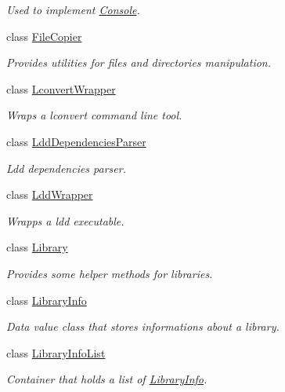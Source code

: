 \begin{DoxyCompactItemize}
\begin{DoxyCompactList}\small\item\em Used to implement \hyperlink{class_mdt_1_1_deploy_utils_1_1_console}{Console}. \end{DoxyCompactList}\item 
class \hyperlink{class_mdt_1_1_deploy_utils_1_1_file_copier}{File\+Copier}
\begin{DoxyCompactList}\small\item\em Provides utilities for files and directories manipulation. \end{DoxyCompactList}\item 
class \hyperlink{class_mdt_1_1_deploy_utils_1_1_lconvert_wrapper}{Lconvert\+Wrapper}
\begin{DoxyCompactList}\small\item\em Wraps a lconvert command line tool. \end{DoxyCompactList}\item 
class \hyperlink{class_mdt_1_1_deploy_utils_1_1_ldd_dependencies_parser}{Ldd\+Dependencies\+Parser}
\begin{DoxyCompactList}\small\item\em Ldd dependencies parser. \end{DoxyCompactList}\item 
class \hyperlink{class_mdt_1_1_deploy_utils_1_1_ldd_wrapper}{Ldd\+Wrapper}
\begin{DoxyCompactList}\small\item\em Wrapps a ldd executable. \end{DoxyCompactList}\item 
class \hyperlink{class_mdt_1_1_deploy_utils_1_1_library}{Library}
\begin{DoxyCompactList}\small\item\em Provides some helper methods for libraries. \end{DoxyCompactList}\item 
class \hyperlink{class_mdt_1_1_deploy_utils_1_1_library_info}{Library\+Info}
\begin{DoxyCompactList}\small\item\em Data value class that stores informations about a library. \end{DoxyCompactList}\item 
class \hyperlink{class_mdt_1_1_deploy_utils_1_1_library_info_list}{Library\+Info\+List}
\begin{DoxyCompactList}\small\item\em Container that holds a list of \hyperlink{class_mdt_1_1_deploy_utils_1_1_library_info}{Library\+Info}. \end{DoxyCompactList}\item 

\end{DoxyCompactItemize}
